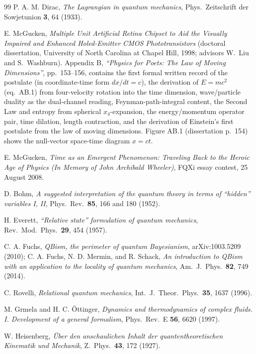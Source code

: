 \documentclass[11pt,a4paper]{article}
\begin{document}
\begin{thebibliography}{99}
 P. A. M. Dirac, \emph{The Lagrangian in quantum mechanics}, Phys.\ Zeitschrift der Sowjetunion \textbf{3}, 64 (1933).

 E. McGucken, \emph{Multiple Unit Artificial Retina Chipset to Aid the Visually Impaired and Enhanced Holed-Emitter CMOS Phototransistors} (doctoral dissertation, University of North Carolina at Chapel Hill, 1998; advisors W.\ Liu and S.\ Washburn). Appendix B, \emph{``Physics for Poets: The Law of Moving Dimensions''}, pp.\ 153--156, contains the first formal written record of the postulate (in coordinate-time form $dx/dt = c$), the derivation of $E = mc^2$ (eq.\ AB.1) from four-velocity rotation into the time dimension, wave/particle duality as the dual-channel reading, Feynman-path-integral content, the Second Law and entropy from spherical $x_4$-expansion, the energy/momentum operator pair, time dilation, length contraction, and the derivation of Einstein's first postulate from the law of moving dimensions. Figure AB.1 (dissertation p.\ 154) shows the null-vector space-time diagram $x = ct$.

 E. McGucken, \emph{Time as an Emergent Phenomenon: Traveling Back to the Heroic Age of Physics (In Memory of John Archibald Wheeler)}, FQXi essay contest, 25 August 2008.

 D. Bohm, \emph{A suggested interpretation of the quantum theory in terms of ``hidden'' variables I, II}, Phys.\ Rev.\ \textbf{85}, 166 and 180 (1952).

 H. Everett, \emph{``Relative state'' formulation of quantum mechanics}, Rev.\ Mod.\ Phys.\ \textbf{29}, 454 (1957).

 C. A. Fuchs, \emph{QBism, the perimeter of quantum Bayesianism}, arXiv:1003.5209 (2010); C. A. Fuchs, N. D. Mermin, and R. Schack, \emph{An introduction to QBism with an application to the locality of quantum mechanics}, Am.\ J.\ Phys.\ \textbf{82}, 749 (2014).

 C. Rovelli, \emph{Relational quantum mechanics}, Int.\ J.\ Theor.\ Phys.\ \textbf{35}, 1637 (1996).

 M. Grmela and H. C. \"Ottinger, \emph{Dynamics and thermodynamics of complex fluids. I. Development of a general formalism}, Phys.\ Rev.\ E \textbf{56}, 6620 (1997).

 W. Heisenberg, \emph{\"Uber den anschaulichen Inhalt der quantentheoretischen Kinematik und Mechanik}, Z.\ Phys.\ \textbf{43}, 172 (1927).


\end{thebibliography}
\end{document}

